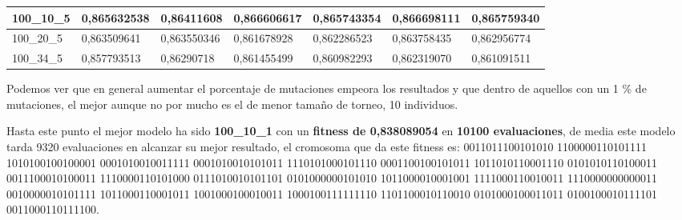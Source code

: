 \documentclass[12pt, spanish, pdftex]{UC3M_document}
\begin{document}
\begin{table}[H]
{\begin{tabular}{|l|l|l|l|l|l|l|}
			100\_10\_5                                                                           & \cellcolor[HTML]{F4E783}0,865632538                                            & \cellcolor[HTML]{63BE7B}0,86411608                                             & \cellcolor[HTML]{F9766E}0,866606617                                            & \cellcolor[HTML]{FFEB84}0,865743354                                            & \cellcolor[HTML]{F8696B}0,866698111                                            & \cellcolor[HTML]{F8696B}0,865759340                                                \\ \hline
			100\_20\_5                                                                           & \cellcolor[HTML]{FFEB84}0,863509641                                            & \cellcolor[HTML]{FED680}0,863550346                                            & \cellcolor[HTML]{63BE7B}0,861678928                                            & \cellcolor[HTML]{96CC7D}0,862286523                                            & \cellcolor[HTML]{F8696B}0,863758435                                            & \cellcolor[HTML]{FA8170}0,862956774                                                \\ \hline
			100\_34\_5                                                                           & \cellcolor[HTML]{63BE7B}0,857793513                                            & \cellcolor[HTML]{F8696B}0,86290718                                             & \cellcolor[HTML]{FFEB84}0,861455499                                            & \cellcolor[HTML]{EAE582}0,860982293                                            & \cellcolor[HTML]{FB9E76}0,862319070                                            & \cellcolor[HTML]{FB9173}0,861091511                                                \\ \hline
		\end{tabular}%
	}
\end{table}
\vspace{-.5cm}
Podemos ver que en general aumentar el porcentaje de mutaciones empeora los resultados y que dentro de aquellos con un 1 \% de mutaciones, el mejor aunque no por mucho es el de menor tamaño de torneo, 10 individuos.

Hasta este punto el mejor modelo ha sido \textbf{100\_10\_1} con un \textbf{fitness de 0,838089054} en \textbf{10100 evaluaciones}, de media este modelo tarda 9320 evaluaciones en alcanzar su mejor resultado, el cromosoma que da este fitness es: 0011011100101010 1100000110101111 1010100100100001 0001010010011111 0001010010101011 1110101000101110 0001100100101011 1011010110001110 0101010110100011 0011100010100011 1110000110101000 0111010010101101 0101000000101010 1011000010001001 1111000110010011 1110000000000011 0010000010101111 1011000110001011 1001000100010011 1000100111111110 1101100010110010 0101000100011011 0100100010111101 0011000110111100. 
\end{document}
